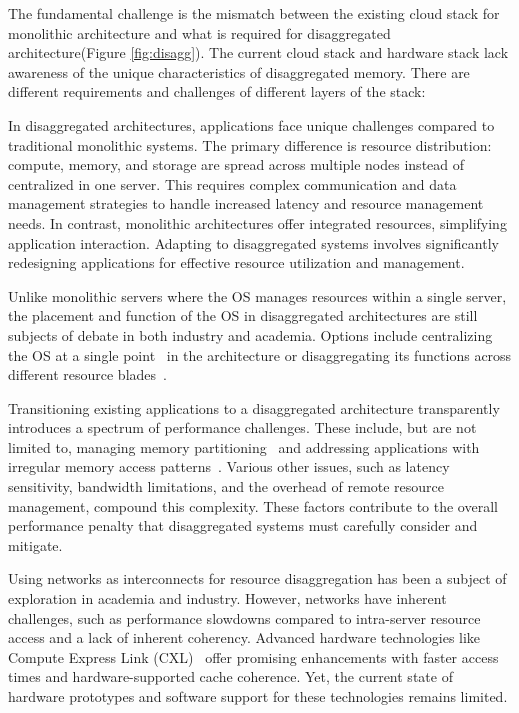 The fundamental challenge is the mismatch between the existing cloud stack for monolithic architecture and what is required for disaggregated architecture(Figure \ref{fig:disagg}). The current cloud stack and hardware stack lack awareness of the unique characteristics of disaggregated memory. There are different requirements and challenges of different layers of the stack:


 In disaggregated architectures, applications face unique challenges compared to traditional monolithic systems. The primary difference is resource distribution: compute, memory, and storage are spread across multiple nodes instead of centralized in one server. This requires complex communication and data management strategies to handle increased latency and resource management needs. In contrast, monolithic architectures offer integrated resources, simplifying application interaction. Adapting to disaggregated systems involves significantly redesigning applications for effective resource utilization and management.

 Unlike monolithic servers where the OS manages resources within a single server, the placement and function of the OS in disaggregated architectures are still subjects of debate in both industry and academia. Options include centralizing the OS at a single point~\cite{mind} in the architecture or disaggregating its functions across different resource blades~\cite{legoos}.

 Transitioning existing applications to a disaggregated architecture transparently introduces a spectrum of performance challenges. These include, but are not limited to, managing memory partitioning~\cite{jiffy} and addressing applications with irregular memory access patterns~\cite{chase}. Various other issues, such as latency sensitivity, bandwidth limitations, and the overhead of remote resource management, compound this complexity. These factors contribute to the overall performance penalty that disaggregated systems must carefully consider and mitigate.

 Using networks as interconnects for resource disaggregation has been a subject of exploration in academia and industry. However, networks have inherent challenges, such as performance slowdowns compared to intra-server resource access and a lack of inherent coherency. Advanced hardware technologies like Compute Express Link (CXL)~\cite{cxl} offer promising enhancements with faster access times and hardware-supported cache coherence. Yet, the current state of hardware prototypes and software support for these technologies remains limited.

